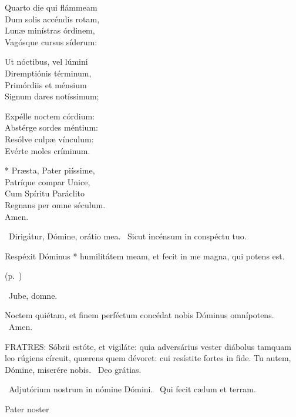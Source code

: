 Quarto die qui flámmeam\\
Dum solis accéndis rotam,\\
Lunæ minístras órdinem,\\
Vagósque cursus síderum:

Ut nóctibus, vel lúmini\\
Diremptiónis términum,\\
Primórdiis et ménsium\\
Signum dares notíssimum;

Expélle noctem córdium:\\
Abstérge sordes méntium:\\
Resólve culpæ vínculum:\\
Evérte moles críminum.

* Præsta, Pater piíssime,\\
Patríque compar Unice,\\
Cum Spíritu Paráclito\\
Regnans per omne séculum.\\
Amen.

\V\ Dirigátur, Dómine, orátio mea. \R\ Sicut incénsum in conspéctu tuo.


 Respéxit Dóminus * humilitátem meam, et fecit in me magna, qui potens est.

 (p.~\pageref{feria4:precesferialesvesperas})


\sectionornament


\V\ Jube, domne.

 Noctem quiétam, et finem perféctum concédat nobis Dóminus omnípotens. \R\ Amen.


\lettrine[lines=2]{F}{RATRES}: Sóbrii estóte, et vigiláte: quia adversárius vester diábolus tamquam leo rúgiens círcuit, quærens quem dévoret: cui resístite fortes in fide. Tu autem, Dómine, miserére nobis. \R\ Deo grátias.

\V\ Adjutórium nostrum in nómine Dómini. \R\ Qui fecit cælum et terram.

Pater noster 

